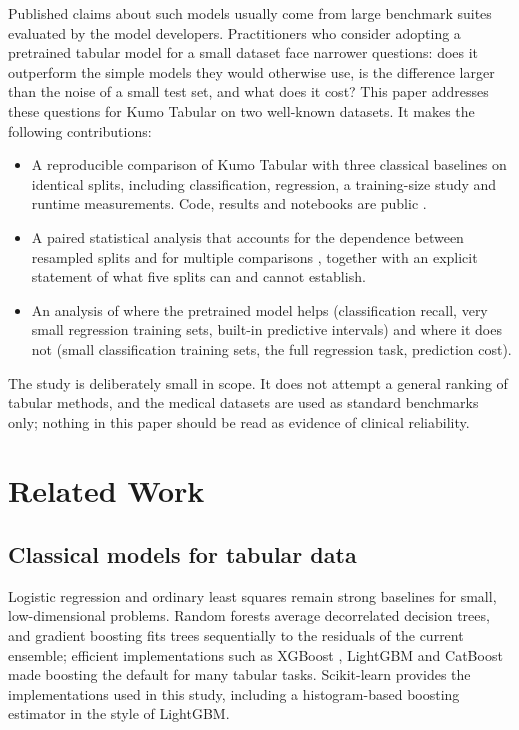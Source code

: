 \documentclass{ieeeaccess}
\begin{document}
Published claims about such models usually come from large benchmark suites evaluated by the model developers. Practitioners who consider adopting a pretrained tabular model for a small dataset face narrower questions: does it outperform the simple models they would otherwise use, is the difference larger than the noise of a small test set, and what does it cost? This paper addresses these questions for Kumo Tabular on two well-known datasets. It makes the following contributions:
\begin{itemize}
\item A reproducible comparison of Kumo Tabular with three classical baselines on identical splits, including classification, regression, a training-size study and runtime measurements. Code, results and notebooks are public \cite{project_repo,project_kaggle}.
\item A paired statistical analysis that accounts for the dependence between resampled splits \cite{nadeau2003inference} and for multiple comparisons \cite{holm1979}, together with an explicit statement of what five splits can and cannot establish.
\item An analysis of where the pretrained model helps (classification recall, very small regression training sets, built-in predictive intervals) and where it does not (small classification training sets, the full regression task, prediction cost).
\end{itemize}

The study is deliberately small in scope. It does not attempt a general ranking of tabular methods, and the medical datasets are used as standard benchmarks only; nothing in this paper should be read as evidence of clinical reliability.

\section{Related Work}

\subsection{Classical models for tabular data}
Logistic regression \cite{cox1958logistic} and ordinary least squares remain strong baselines for small, low-dimensional problems. Random forests \cite{breiman2001rf} average decorrelated decision trees, and gradient boosting \cite{friedman2001gbm} fits trees sequentially to the residuals of the current ensemble; efficient implementations such as XGBoost \cite{chen2016xgboost}, LightGBM \cite{ke2017lightgbm} and CatBoost \cite{prokhorenkova2018catboost} made boosting the default for many tabular tasks. Scikit-learn \cite{pedregosa2011sklearn} provides the implementations used in this study, including a histogram-based boosting estimator in the style of LightGBM.
\end{document}
